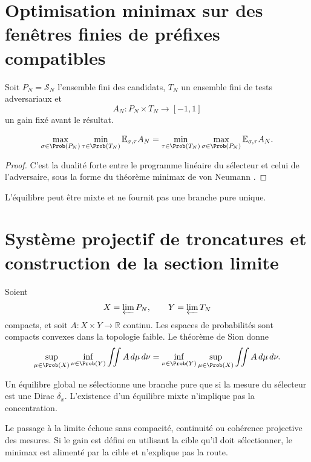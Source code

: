 \section{Optimisation minimax sur des fenêtres finies de préfixes compatibles}

Soit \(P_N=\mathcal S_N\) l'ensemble fini des candidats, \(T_N\) un ensemble
fini de tests adversariaux et
\[
  A_N:P_N\times T_N\to[-1,1]
\]
un gain fixé avant le résultat.

\begin{theorem}
\[
 \max_{\sigma\in\Prob(P_N)}
 \min_{\tau\in\Prob(T_N)}
 \mathbb E_{\sigma,\tau}A_N
 =
 \min_{\tau\in\Prob(T_N)}
 \max_{\sigma\in\Prob(P_N)}
 \mathbb E_{\sigma,\tau}A_N.
\]
\end{theorem}

\begin{proof}
C'est la dualité forte entre le programme linéaire du sélecteur et celui de
l'adversaire, sous la forme du théorème minimax de von Neumann
\citep{vonneumann1928}.
\end{proof}

L'équilibre peut être mixte et ne fournit pas une branche pure unique.

\section{Système projectif de troncatures et construction de la section limite}

Soient
\[
 X=\varprojlim P_N,
 \qquad
 Y=\varprojlim T_N
\]
compacts, et soit \(A:X\times Y\to\mathbb R\) continu. Les espaces de
probabilités sont compacts convexes dans la topologie faible. Le théorème de
Sion \citep{sion1958} donne
\[
 \sup_{\mu\in\Prob(X)}\inf_{\nu\in\Prob(Y)}
 \iint A\,d\mu\,d\nu
 =
 \inf_{\nu\in\Prob(Y)}\sup_{\mu\in\Prob(X)}
 \iint A\,d\mu\,d\nu.
\]

\begin{corollary}
Un équilibre global ne sélectionne une branche pure que si la mesure du sélecteur
est une Dirac \(\delta_x\). L'existence d'un équilibre mixte n'implique pas
la concentration.
\end{corollary}

\begin{remark}
Le passage à la limite échoue sans compacité, continuité ou cohérence
projective des mesures. Si le gain est défini en utilisant la cible qu'il doit
sélectionner, le minimax est alimenté par la cible et n'explique pas la route.
\end{remark}

